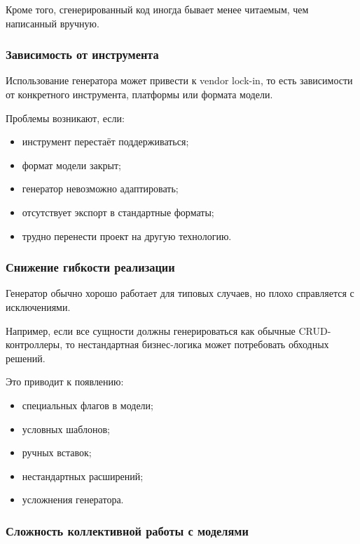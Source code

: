 \documentclass[12pt,a4paper]{article}
\begin{document}
Кроме того, сгенерированный код иногда бывает менее читаемым, чем написанный вручную.

\subsubsection{Зависимость от инструмента}

Использование генератора может привести к vendor lock-in, то есть зависимости от конкретного инструмента, платформы или формата модели.

Проблемы возникают, если:

\begin{itemize}
    \item инструмент перестаёт поддерживаться;
    \item формат модели закрыт;
    \item генератор невозможно адаптировать;
    \item отсутствует экспорт в стандартные форматы;
    \item трудно перенести проект на другую технологию.
\end{itemize}

\subsubsection{Снижение гибкости реализации}

Генератор обычно хорошо работает для типовых случаев, но плохо справляется с исключениями.

Например, если все сущности должны генерироваться как обычные CRUD-контроллеры, то нестандартная бизнес-логика может потребовать обходных решений.

Это приводит к появлению:

\begin{itemize}
    \item специальных флагов в модели;
    \item условных шаблонов;
    \item ручных вставок;
    \item нестандартных расширений;
    \item усложнения генератора.
\end{itemize}

\subsubsection{Сложность коллективной работы с моделями}
\end{document}
